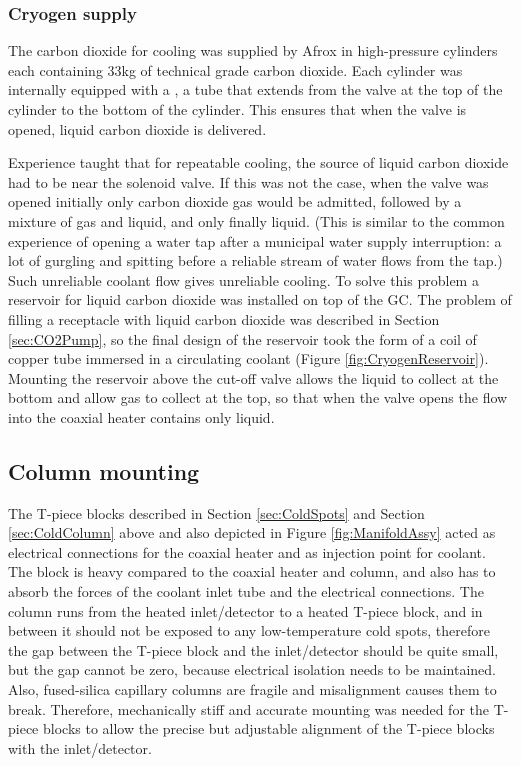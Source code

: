 \subsubsection{Cryogen supply}

The carbon dioxide for cooling was supplied by Afrox in high-pressure
cylinders each containing 33kg of technical grade carbon dioxide. Each cylinder
was internally equipped with a , a tube that extends from the
valve at the top of the cylinder to the bottom of the cylinder. This ensures
that when the valve is opened, liquid carbon dioxide is delivered.

Experience taught that for repeatable cooling, the source of liquid carbon
dioxide had to be near the solenoid valve. If this was not the case, when the
valve was opened initially only carbon dioxide gas would be admitted, followed
by a mixture of gas and liquid, and only finally liquid. (This is similar to the
common experience of opening a water tap after a municipal water supply
interruption: a lot of gurgling and spitting before a reliable stream of water
flows from the tap.) Such unreliable coolant flow gives unreliable cooling.
To solve this problem a reservoir for liquid carbon dioxide was installed on top
of the GC. The problem of filling a receptacle with liquid carbon dioxide was
described in Section \ref{sec:CO2Pump}, so the final design of the reservoir
took the form of a coil of copper tube immersed in a circulating coolant (Figure
\ref{fig:CryogenReservoir}). Mounting the reservoir above the cut-off valve
allows the liquid to collect at the bottom and allow gas to collect at the top,
so that when the valve opens the flow into the coaxial heater contains only
liquid.

\subsection{Column mounting}

The T-piece blocks described in Section \ref{sec:ColdSpots} and Section
\ref{sec:ColdColumn} above and also depicted in Figure \ref{fig:ManifoldAssy}
acted as electrical connections for the coaxial heater and as injection point
for coolant. The block is heavy compared to the coaxial heater and column, and
also has to absorb the forces of the coolant inlet tube and the electrical
connections. The column runs from the heated inlet/detector to a heated T-piece
block, and in between it should not be exposed to any low-temperature cold
spots, therefore the gap between the T-piece block and the inlet/detector should
be quite small, but the gap cannot be zero, because electrical isolation needs
to be maintained. Also, fused-silica capillary columns are fragile and
misalignment causes them to break. Therefore, mechanically stiff and accurate
mounting was needed for the T-piece blocks to allow the precise but adjustable
alignment of the T-piece blocks with the inlet/detector.

